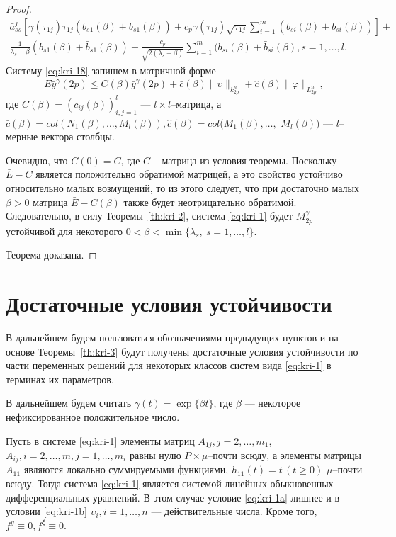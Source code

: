 \begin{proof}
\begin{multline*}
    \bar a^{j}_{ss}\left [\gamma (\tau _{1j})\tau _{1j}(b_{s1}(\beta ) +
    \bar b_{s1}(\beta )) +
     c_p\gamma (\tau _{1j})\sqrt{\tau _{1j}}\sum\limits_{i =1}^{m}(b_{si}(\beta ) + \bar b_{si}(\beta
     ))\right ] + \\
     \frac{1}{\lambda _s - \beta}(b_{s1}(\beta ) + \bar b_{s1}(\beta
     ))+ \frac{c_p}{\sqrt{2(\lambda_s -\beta)}} \sum\limits_{i=1}^{m}(b_{si}(\beta ) + \bar
     b_{si}(\beta), s = 1,\dots,l.
    \end{multline*}
    Систему \eqref{eq:kri-18} запишем в матричной форме
    $$
    \bar E\bar y^\gamma(2p) \leq  C(\beta )\bar y^\gamma(2p)+ \bar
    c(\beta ) \|\upsilon\|_{k^n_{2p}} + \hat c(\beta )\|\varphi
    \|_{L_{2p}^n},
    $$
    где $C(\beta) =(c_{ij}(\beta))_{i,j=1}^l$
    --- $l\times l$--матрица, а $\bar c(\beta) = col (N_1(\beta ), \dots, M_l(\beta )),
    \hat c(\beta ) = col (M_1(\beta ), \dots, $ $M_l(\beta ))$ ---
    $l$--мерные вектора столбцы.
    
    Очевидно, что $C(0) = C$, где $C$ -- матрица из условия теоремы.
    Поскольку $\bar E - C$ является  положительно обратимой матрицей, а
    это свойство устойчиво относительно малых возмущений, то из этого
    следует, что при достаточно малых $\beta > 0$ матрица $\bar E-
    C(\beta )$ также будет неотрицательно обратимой. Следовательно, в
    силу Теоремы~\ref{th:kri-2}, система \eqref{eq:kri-1} будет $M_{2p}^\gamma$--устойчивой для
    некоторого $0< \beta < \min \{\lambda _s, \ s = 1, \dots,l \}$.
    
    Теорема доказана.
\end{proof}

\section{Достаточные условия устойчивости}

В дальнейшем
будем пользоваться обозначениями предыдущих пунктов и на основе
Теоремы~\ref{th:kri-3} будут получены достаточные условия устойчивости по части
переменных решений для некоторых классов систем вида \eqref{eq:kri-1} в терминах
их параметров.

В дальнейшем будем считать $\gamma (t) = \exp \{\beta t\}$, где
$\beta$ --- некоторое  нефиксированное положительное число.

Пусть в системе \eqref{eq:kri-1} элементы матриц $A_{1j}, j = 2, \dots, m_1$,
$A_{ij}, i = 2, \dots, m, j = 1, \dots, m_i$ равны нулю
$P\times\mu$--почти всюду, а элементы матрицы $A_{11}$ являются
локально суммируемыми функциями, $h_{11}(t) = t \, (t \geq 0)$ $\mu
$--почти всюду. Тогда система \eqref{eq:kri-1} является системой линейных
обыкновенных дифференциальных уравнений. В этом случае условие \eqref{eq:kri-1a}
лишнее и в условии \eqref{eq:kri-1b} $\upsilon_i, i = 1, \dots, n$ ---
действительные числа. Кроме того, $f^y \equiv 0, f^\xi \equiv 0$.


